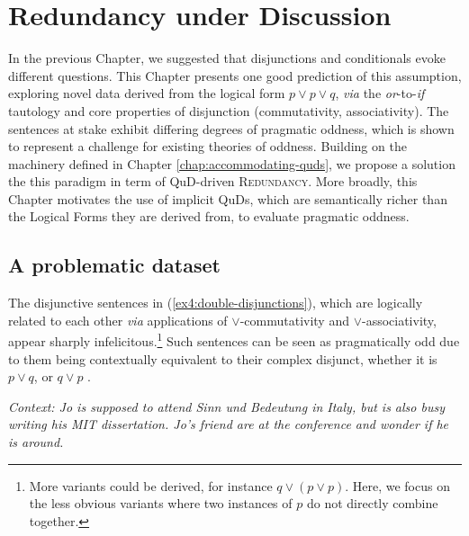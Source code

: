 
\chapter[Redundancy under Discussion]{Redundancy under Discussion\footnotemark}\label{chap:redundancy}

In the previous Chapter, we suggested that disjunctions and conditionals evoke different questions. This Chapter presents one good prediction of this assumption, exploring novel data derived from the logical form $p\vee p \vee q$, \textit{via} the \textit{or}-to-\textit{if} tautology and core properties of disjunction (commutativity, associativity). The sentences at stake exhibit differing degrees of pragmatic oddness, which is shown to represent a challenge for existing theories of oddness. Building on the machinery defined in Chapter \ref{chap:accommodating-quds}, we propose a solution the this paradigm in term of QuD-driven \textsc{Redundancy}. More broadly, this Chapter motivates the use of implicit QuDs, which are semantically richer than the Logical Forms they are derived from, to evaluate pragmatic oddness.


\section{A problematic dataset}

The disjunctive sentences in (\ref{ex4:double-disjunctions}), which are logically related to each other \textit{via} applications of $\vee$-commutativity and $\vee$-associativity, appear sharply infelicitous.\footnote{More variants could be derived, for instance $q\vee(p\vee p)$. Here, we focus on the less obvious variants where two instances of $p$ do not directly combine together.} Such sentences can be seen as pragmatically odd due to them being contextually equivalent to their complex disjunct, whether it is $p\vee q$, or $q \vee p$ \citep{Meyer2013,Mayr2016,Katzir2014}.

\begin{exe}
	\ex \textit{Context: Jo is supposed to attend Sinn und Bedeutung in Italy, but is also busy writing his MIT dissertation. Jo's friend are at the conference and wonder if he is around.}\label{ex4:double-disjunctions}
	\begin{xlist}
		\label{ex4:pv(pvq)}
		\label{ex4:pv(qvp)}
		\label{ex4:(pvq)vp}
		\label{ex4:(qvp)vp}
	\end{xlist}
\end{exe} 

